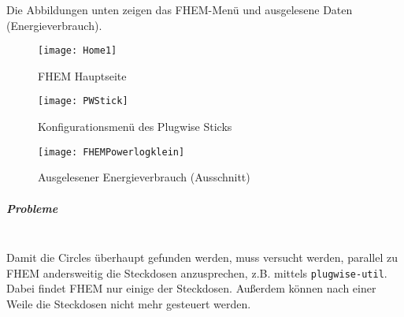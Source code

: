 Die Abbildungen unten zeigen das FHEM-Menü und ausgelesene Daten (Energieverbrauch).\newline

\begin{figure}[H]
  \caption{FHEM Hauptseite}
  \centering
  \texttt{[image: Home1]}
\end{figure}

\begin{figure}[H]
  \caption{Konfigurationsmenü des Plugwise Sticks}
  \centering
  \texttt{[image: PWStick]}
\end{figure}

\begin{figure}[H]
  \caption{Ausgelesener Energieverbrauch (Ausschnitt)}
  \centering
  \texttt{[image: FHEMPowerlogklein]}
\end{figure}

\subparagraph{Probleme}\mbox{} \\
Damit die Circles überhaupt gefunden werden, muss versucht werden, parallel zu FHEM andersweitig die Steckdosen anzusprechen, z.B. mittels \texttt{plugwise-util}. Dabei findet FHEM nur einige der Steckdosen. Außerdem können nach einer Weile die Steckdosen nicht mehr gesteuert werden.\newline \newline

